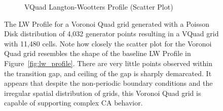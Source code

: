 \documentclass[a4paper,11pt]{article}
\begin{document}
\begin{figure}[htp]
\begin{subfigure}[t]{0.45\textwidth}
  \caption{VQuad Langton-Wootters Profile (Scatter Plot)}
  \label{fig:vor_lw_scatter}
\end{subfigure}
\caption[Voronoi Quad Langton-Wootters Profile]{
  The LW Profile for a Voronoi Quad grid generated with a Poisson Disk distribution of 4,032 generator points resulting in a VQuad grid with 11,480 cells. Note how closely the scatter plot for the Voronoi Quad grid resembles the shape of the baseline LW Profile in Figure~\ref{fig:lw_profile}. There are very little points observed within the transition gap, and ceiling of the gap is sharply demarcated. It appears that despite the non-periodic boundary conditions and the irregular spatial distribution of grids, this Voronoi Quad grid is capable of supporting complex CA behavior.
}
\label{fig:vor_lw_profile}
\end{figure}
\end{document}
